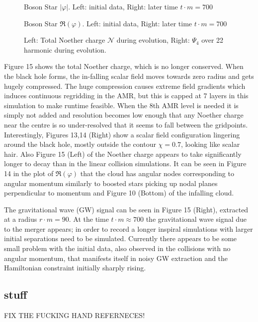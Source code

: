 \documentclass[11pt, oneside]{report}  %
\newcommand{\vp}{\varphi}
\numberwithin{equation}{section}
\begin{document}
  \begin{figure}[H]
  \caption{Boson Star $|\vp|$. Left: initial data, Right: later time $t \cdot m = 700$}
  \centering
  \hfill
\end{figure}
  \begin{figure}[H]
  \caption{Boson Star $\Re(\vp)$. Left: initial data, Right: later time $t \cdot m = 700$}
  \centering
  \hfill
\end{figure}
  \begin{figure}[H]
  \caption{Left: Total Noether charge $\mathcal{N}$ during evolution, Right: $\Psi_4$ over 22 harmonic during evolution.}
  \centering
  \hfill
\end{figure}
Figure 15 shows the total Noether charge, which is no longer conserved. When the black hole forms, the in-falling scalar field moves towards zero radius and gets hugely compressed. The huge compression causes extreme field gradients which induces continuous regridding in the AMR, but this is capped at 7 layers in this simulation to make runtime feasible. When the 8th AMR level is needed it is simply not added and resolution becomes low enough that any Noether charge near the centre is so under-resolved that it seems to fall between the gridpoints. Interestingly, Figures 13,14 (Right) show a scalar field configuration lingering around the black hole, mostly outside the contour $\chi=0.7$, looking like scalar hair. Also Figure 15 (Left) of the Noether charge appears to take significantly longer to decay than in the linear collision simulations. It can be seen in Figure 14 in the plot of $\Re(\vp)$ that the cloud has angular nodes corresponding to angular momentum similarly to boosted stars picking up nodal planes perpendicular to momentum and Figure 10 (Bottom) of the infalling cloud. 

The gravitational wave (GW) signal can be seen in Figure 15 (Right), extracted at a radius $r \cdot m = 90$. At the time $t \cdot m \approx 700$ the gravitational wave signal due to the merger appears; in order to record a longer inspiral simulations with larger initial separations need to be simulated. Currently there appears to be some small problem with the initial data, also observed in the collisions with no angular momentum, that manifests itself in noisy GW extraction and the Hamiltonian constraint initially sharply rising. 



\subsection{stuff}
FIX THE FUCKING HAND REFERNECES!
\end{document}
